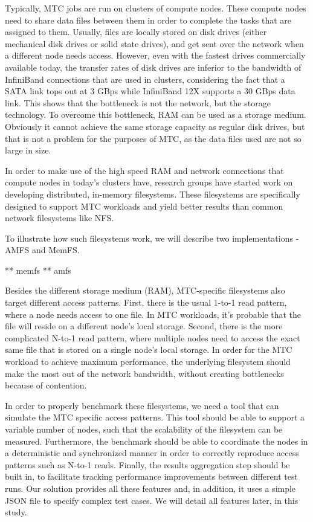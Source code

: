 Typically, MTC jobs are run on clusters of compute nodes. These compute nodes need to share data files between them in order to complete the tasks that are assigned to them. Usually, files are locally stored on disk drives (either mechanical disk drives or solid state drives), and get sent over the network when a different node needs access. However, even with the fastest drives commercially available today, the transfer rates of disk drives are inferior to the bandwidth of InfiniBand connections that are used in clusters, considering the fact that a SATA link tops out at 3 GBps while InfiniBand 12X supports a 30 GBps data link. This shows that the bottleneck is not the network, but the storage technology. To overcome this bottleneck, RAM can be used as a storage medium. Obviously it cannot achieve the same storage capacity as regular disk drives, but that is not a problem for the purposes of MTC, as the data files used are not so large in size.

In order to make use of the high speed RAM and network connections that compute nodes in today's clusters have, research groups have started work on developing distributed, in-memory filesystems. These filesystems are specifically designed to support MTC workloads and yield better results than common network filesystems like NFS.


To illustrate how such filesystems work, we will describe two implementations - AMFS\cite{amfs} and MemFS\cite{memfs}.

** memfs
** amfs



Besides the different storage medium (RAM), MTC-specific filesystems also target different access patterns. First, there is the usual 1-to-1 read pattern, where a node needs access to one file. In MTC workloads, it's probable that the file will reside on a different node's local storage. Second, there is the more complicated N-to-1 read pattern, where multiple nodes need to access the exact same file that is stored on a single node's local storage. In order for the MTC workload to achieve maximum performance, the underlying filesystem should make the most out of the network bandwidth, without creating bottlenecks because of contention.

In order to properly benchmark these filesystems, we need a tool that can simulate the MTC specific access patterns. This tool should be able to support a variable number of nodes, such that the scalability of the filesystem can be measured. Furthermore, the benchmark should be able to coordinate the nodes in a deterministic and synchronized manner in order to correctly reproduce access patterns such as N-to-1 reads. Finally, the results aggregation step should be built in, to facilitate tracking performance improvements between different test runs. Our solution provides all these features and, in addition, it uses a simple JSON\cite{json} file to specify complex test cases. We will detail all features later, in this study.


